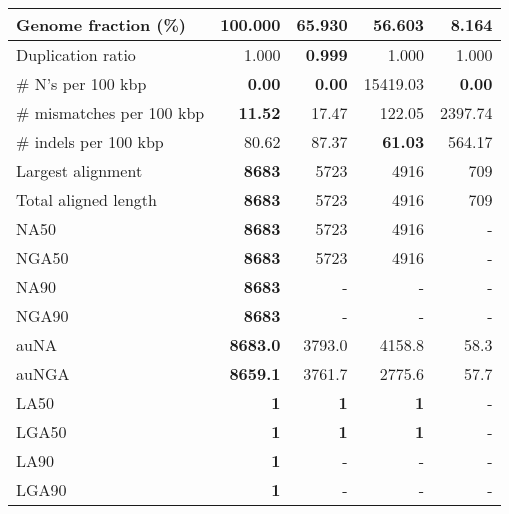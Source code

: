 \documentclass[12pt,a4paper]{article}
\begin{document}
\begin{table}[ht]
\begin{center}
\begin{tabular}{|l*{4}{|r}|}
Genome fraction (\%) & {\bf 100.000} & 65.930 & 56.603 & 8.164 \\ \hline
Duplication ratio & 1.000 & {\bf 0.999} & 1.000 & 1.000 \\ \hline
\# N's per 100 kbp & {\bf 0.00} & {\bf 0.00} & 15419.03 & {\bf 0.00} \\ \hline
\# mismatches per 100 kbp & {\bf 11.52} & 17.47 & 122.05 & 2397.74 \\ \hline
\# indels per 100 kbp & 80.62 & 87.37 & {\bf 61.03} & 564.17 \\ \hline
Largest alignment & {\bf 8683} & 5723 & 4916 & 709 \\ \hline
Total aligned length & {\bf 8683} & 5723 & 4916 & 709 \\ \hline
NA50 & {\bf 8683} & 5723 & 4916 & - \\ \hline
NGA50 & {\bf 8683} & 5723 & 4916 & - \\ \hline
NA90 & {\bf 8683} & - & - & - \\ \hline
NGA90 & {\bf 8683} & - & - & - \\ \hline
auNA & {\bf 8683.0} & 3793.0 & 4158.8 & 58.3 \\ \hline
auNGA & {\bf 8659.1} & 3761.7 & 2775.6 & 57.7 \\ \hline
LA50 & {\bf 1} & {\bf 1} & {\bf 1} & - \\ \hline
LGA50 & {\bf 1} & {\bf 1} & {\bf 1} & - \\ \hline
LA90 & {\bf 1} & - & - & - \\ \hline
LGA90 & {\bf 1} & - & - & - \\ \hline
\end{tabular}
\end{center}
\end{table}
\end{document}
